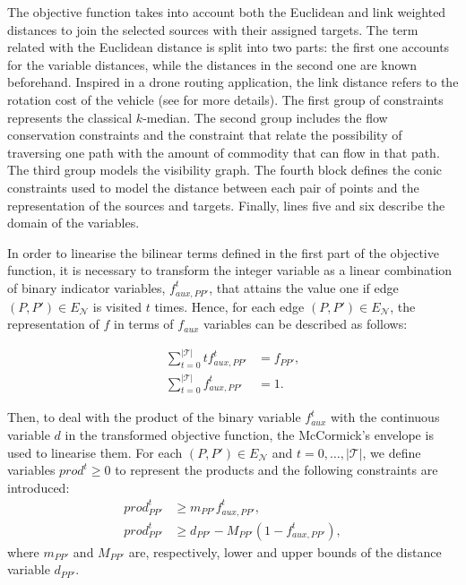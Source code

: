\documentclass[a4paper,  review, authoryear, 1p.]{elsarticle}
\newcommand{\EN}{{E^{}_{\mathcal N}}}
\newcommand{\CV}[1]{{\color{blue}#1}}
\begin{document}
		\CV{
		The objective function takes into account both the Euclidean and link weighted distances to join the selected sources with their assigned targets. \CV{The term related with the Euclidean distance is split into two parts: the first one accounts for the variable distances, while the distances in the second one are known beforehand. Inspired in a drone routing application, the link distance refers to the rotation cost of the vehicle (see \cite{maheshwari2000} for more details)}. The first group of constraints represents the classical $k$-median. The second group includes the flow conservation constraints and the constraint that relate the possibility of traversing one path with the amount of commodity that can flow in that path. The third group models the visibility graph. The fourth block defines the conic constraints used to model the distance between each pair of points and the representation of the sources and targets. Finally, lines five and six describe the domain of the variables.
		
		In order to linearise the bilinear terms defined in the first part of the objective function, it is necessary to transform the integer variable as a linear combination of binary indicator variables, $f_{aux,PP'}^t$, that attains the value one if edge $(P,P')\in \EN$ is visited $t$ times. Hence, for each edge $(P,P')\in \EN$, the representation of $f$ in terms of $f_{aux}$ variables can be described as follows:}
		\begin{align*}
			\sum_{t=0}^{|\mathcal T|} t f_{aux,PP'}^t & = f_{PP'},\label{eq:f1}\tag{$f$-representation-C1}\\
			\sum_{t=0}^{|\mathcal T|} f_{aux,PP'}^t & = 1 \label{eq:f2}\tag{$f$-representation-C2}.
		\end{align*}
		
		\CV{
		Then, to deal with the product of the binary variable $f_{aux}^t$ with the continuous variable $d$ in the transformed objective function, the McCormick's envelope is used to linearise them. For each $(P,P')\in \EN$ and $t=0,\ldots,|\mathcal T|$, we define variables $prod^t\geq 0$ to represent the products and the following constraints are introduced:}
		\begin{align}
			prod_{PP'}^t & \geq m_{PP'} f_{aux,PP'}^t, \label{eq:mccormick1}\tag{McCormick-C1}\\
			prod_{PP'}^t & \geq d_{PP'} - M_{PP'}(1 - f_{aux,PP'}^t) \label{eq:mccormick2}\tag{McCormick-C2},
		\end{align}
		where $m_{PP'}$ and $M_{PP'}$ are, respectively, lower and upper bounds of the distance variable $d_{PP'}$.
		
\end{document}
